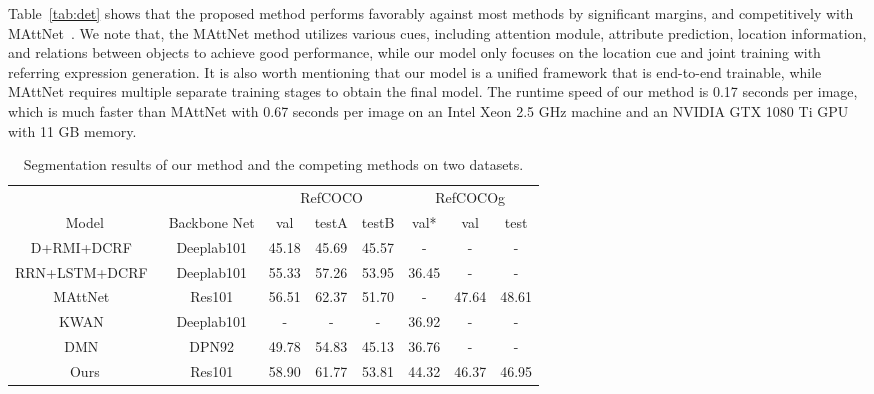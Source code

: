 \documentclass{bmvc2k}
\begin{document}
Table~\ref{tab:det} shows that the proposed method performs favorably against most methods by significant margins, and competitively with MAttNet~\cite{Yu_CVPR_2018}.
We note that, the MAttNet method utilizes various cues, including attention module, attribute prediction, location information, and relations between objects to achieve good performance, while our model only focuses on the location cue and joint training with referring expression generation.
It is also worth mentioning that our model is a unified framework that is end-to-end trainable, while MAttNet requires multiple separate training stages to obtain the final model.
The runtime speed of our method is 0.17 seconds per image, which is much faster than MAttNet with 0.67 seconds per image on 
an Intel Xeon 2.5 GHz machine and an NVIDIA GTX 1080 Ti GPU with 11 GB memory.
\begin{table*}[!t]
    \footnotesize
	\centering
	\def\arraystretch{0.9}
	\setlength\tabcolsep{5pt}
	\caption{Segmentation results of our method and the competing methods on two datasets.}
	\vspace{2mm}
	\label{tab:seg}
	\begin{tabular}{@{}@{}c c c c c c c c@{}}
		\toprule
		& \multicolumn{1}{c}{} & \multicolumn{3}{c}{RefCOCO} & \multicolumn{3}{c}{RefCOCOg} \\
		\cmidrule(lr){3-5} \cmidrule(lr){6-8}
		Model & Backbone Net & val & testA & testB & val* & val & test \\ \midrule
		D+RMI+DCRF~\cite{Liu_ICCV_2017} & Deeplab101 & 45.18 & 45.69 & 45.57 & - & - & - \\
		RRN+LSTM+DCRF~\cite{Li_CVPR_2018} & Deeplab101 & 55.33 & 57.26 & 53.95 & 36.45 & - & - \\
		MAttNet~\cite{Yu_CVPR_2018} & Res101 & 56.51 & 62.37 & 51.70 & - & 47.64 & 48.61 \\
		KWAN~\cite{Shi_ECCV_2018} & Deeplab101 & - & - & - & 36.92 & - & - \\
		DMN~\cite{Margffoy-Tuay_ECCV_2018} & DPN92 & 49.78 & 54.83 & 45.13 & 36.76 & - & - \\
		\midrule
		Ours & Res101 & 58.90 & 61.77 & 53.81 & 44.32 & 46.37 & 46.95 \\
		\bottomrule
	\end{tabular}
	\vspace{-3mm}
\end{table*}
\end{document}
